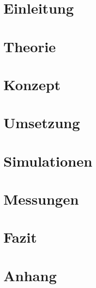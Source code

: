 \documentclass[11pt,a4paper,hidelinks]{article}
\begin{document}










\section{Einleitung}

\pagebreak

\section{Theorie}

\pagebreak

\section{Konzept}

\pagebreak

\section{Umsetzung}

\pagebreak

\section{Simulationen}

\pagebreak

\section{Messungen}

\pagebreak

\section{Fazit}

\pagebreak

\section{Anhang}




\end{document}
